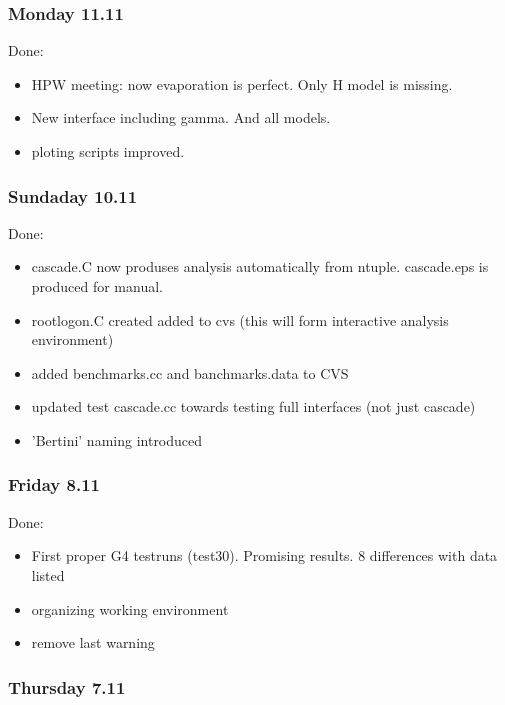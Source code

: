 \subsubsection{Monday 11.11}

Done:

\begin{itemize}

\item HPW meeting: now evaporation is perfect. 
Only H model is
  missing.

\item New interface including gamma. 
And all models.

\item ploting scripts improved.

\end{itemize}

\subsubsection{Sundaday 10.11}

Done:
\begin{itemize}
\item cascade.C now produses analysis automatically from ntuple.
  cascade.eps is produced for manual.
\item rootlogon.C created added to cvs (this will form interactive
  analysis environment)
\item added benchmarks.cc and banchmarks.data to CVS
\item updated test cascade.cc towards testing full interfaces (not
  just cascade)
\item 'Bertini' naming introduced
\end{itemize}

\subsubsection{Friday 8.11}

Done:
\begin{itemize}
\item First proper G4 testruns (test30). Promising results. 8
  differences with data listed
\item organizing working environment
\item remove last warning
\end{itemize}

\subsubsection{Thursday 7.11}

